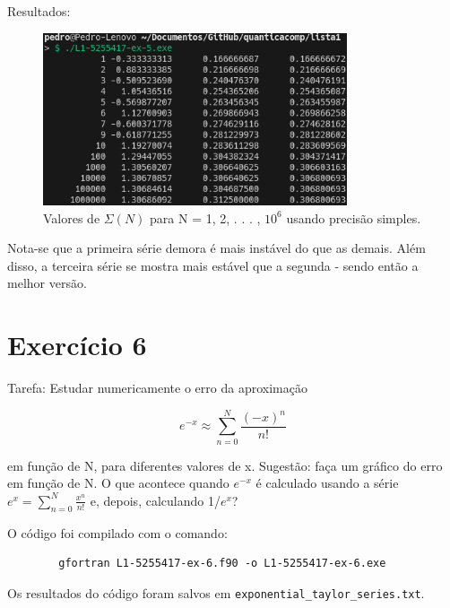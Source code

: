 \documentclass[12pt, a4paper]{article} %
\begin{document}
    Resultados:
    \begin{figure}[H]
        \centering
        \includegraphics[width=0.8\textwidth]{../images/results-ex5.png}
        \caption{Valores de $\Sigma (N)$ para N = 1, 2, . . . , $10^6$ usando precis\~ao simples.}
    \end{figure}

    Nota-se que a primeira s\'erie demora \'e mais inst\'avel do que as demais. Al\'em disso, a terceira s\'erie se mostra mais est\'avel que a segunda - sendo ent\~ao a melhor vers\~ao.

\section{Exerc\'icio 6}

    Tarefa: Estudar numericamente o erro da aproxima\c{c}\~ao

    \begin{equation} e^{-x} \approx \sum_{n=0}^N \frac{(-x)^n}{n!} \end{equation}

    em fun\c{c}\~ao de N, para diferentes valores de x. Sugest\~ao: fa\c{c}a um gr\'afico do erro em fun\c{c}\~ao de N. O que acontece quando $e^{-x}$  \'e calculado usando a s\'erie $e^x = \sum_{n=0}^{N} \frac{x^n}{n!}$ e, depois, calculando 1/$e^x$?


    O c\'odigo foi compilado com o comando:
    \begin{verbatim}
        gfortran L1-5255417-ex-6.f90 -o L1-5255417-ex-6.exe
    \end{verbatim}

    Os resultados do c\'odigo foram salvos em \texttt{exponential\_taylor\_series.txt}.
\end{document}
